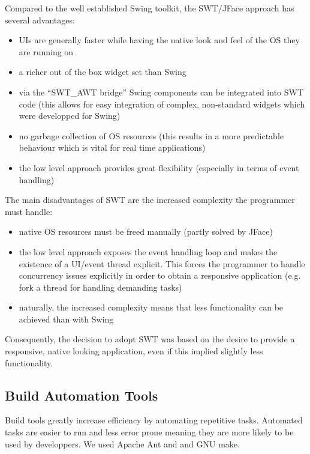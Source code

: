 \documentclass[10pt]{report}
\begin{document}
Compared to the well established Swing toolkit, the SWT/JFace approach has several advantages:
\begin{itemize}
  \item UIs are generally faster while having the native look and feel of the OS they are running on
  \item a richer out of the box widget set than Swing
  \item via the ``SWT\_AWT bridge'' Swing components can be integrated into SWT code (this allows for easy integration of complex, non-standard widgets which were developped for Swing)
  \item no garbage collection of OS resources (this results in a more predictable behaviour which is vital for real time applications)
  \item the low level approach provides great flexibility (especially in terms of event handling)
\end{itemize}

The main disadvantages of SWT are the increased complexity the programmer must handle:
\begin{itemize}
  \item native OS resources must be freed manually (partly solved by JFace)
  \item the low level approach exposes the event handling loop and makes the existence of a UI/event thread explicit. This forces the programmer to handle concurrency issues explicitly in order to obtain a responsive application (e.g. fork a thread for handling demanding tasks)
  \item naturally, the increased complexity means that less functionality can be achieved than with Swing
\end{itemize}

Consequently, the decision to adopt SWT was based on the desire to provide a responsive, native looking application, even if this implied slightly less functionality.

\subsection{Build Automation Tools}

Build tools greatly increase efficiency by automating repetitive tasks. Automated tasks are easier to run and less error prone meaning they are more likely to be used by developpers. We used Apache Ant and and GNU make.
\end{document}
